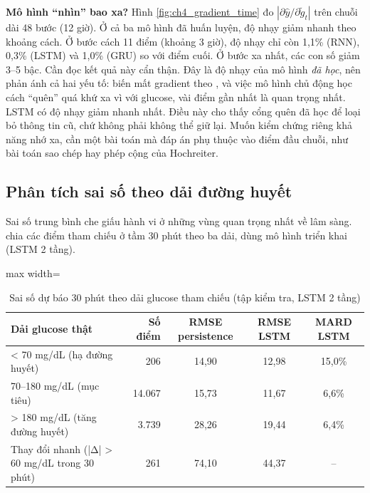 
\textbf{Mô hình ``nhìn'' bao xa?} Hình \ref{fig:ch4_gradient_time} đo $|\partial\hat y/\partial\tilde g_t|$ trên chuỗi dài 48 bước (12 giờ). Ở cả ba mô hình đã huấn luyện, độ nhạy giảm nhanh theo khoảng cách. Ở bước cách 11 điểm (khoảng 3 giờ), độ nhạy chỉ còn 1,1\% (RNN), 0,3\% (LSTM) và 1,0\% (GRU) so với điểm cuối. Ở bước xa nhất, các con số giảm 3–5 bậc. Cần đọc kết quả này cẩn thận. Đây là độ nhạy của mô hình \emph{đã học}, nên phản ánh cả hai yếu tố: biến mất gradient theo , và việc mô hình chủ động học cách ``quên'' quá khứ xa vì với glucose, vài điểm gần nhất là quan trọng nhất. LSTM có độ nhạy giảm nhanh nhất. Điều này cho thấy cổng quên đã học để loại bỏ thông tin cũ, chứ không phải không thể giữ lại. Muốn kiểm chứng riêng khả năng nhớ xa, cần một bài toán mà đáp án phụ thuộc vào điểm đầu chuỗi, như bài toán sao chép hay phép cộng của Hochreiter.

\subsection{Phân tích sai số theo dải đường huyết}

Sai số trung bình che giấu hành vi ở những vùng quan trọng nhất về lâm sàng.  chia các điểm tham chiếu ở tầm 30 phút theo ba dải, dùng mô hình triển khai (LSTM 2 tầng).

\begin{table}[H]
\centering
\caption{Sai số dự báo 30 phút theo dải glucose tham chiếu (tập kiểm tra, LSTM 2 tầng)}
\label{tab:ch4-range}
\small
\begin{adjustbox}{max width=\linewidth}
\begin{tabular}{@{}lrccc@{}}
\toprule
\textbf{Dải glucose thật} & \textbf{Số điểm} & \textbf{RMSE persistence} & \textbf{RMSE LSTM} & \textbf{MARD LSTM} \\
\midrule
< 70 mg/dL (hạ đường huyết) & 206 & 14,90 & 12,98 & 15,0\% \\
70–180 mg/dL (mục tiêu) & 14.067 & 15,73 & 11,67 & 6,6\% \\
> 180 mg/dL (tăng đường huyết) & 3.739 & 28,26 & 19,44 & 6,4\% \\
Thay đổi nhanh (|Δ| > 60 mg/dL trong 30 phút) & 261 & 74,10 & 44,37 & -- \\
\bottomrule
\end{tabular}
\end{adjustbox}
\end{table}

